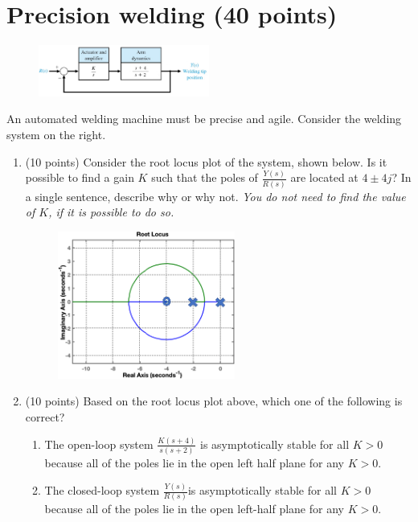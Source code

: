 \documentclass[11pt]{article}
\begin{document}
\section{Precision welding (40 points)}
\begin{figure}
    \centering
    \includegraphics[width=0.5\textwidth]{Acr12457187579904187728.png}
\end{figure}
An automated welding machine must be precise and agile. Consider the welding system on the right.\vspace{3em}
    \begin{enumerate}
        \item (10 points) Consider the root locus plot of the system, shown below. Is it possible to find a gain \(K\) such that the poles of \(\frac{Y(s)}{R(s)}\) are located at \(4\pm 4j\)? In a single sentence, describe why or why not. \textit{You do not need to find the value of \(K\), if it is possible to do so.}
        \begin{figure}[h!]
            \centering
            \includegraphics[width=0.55\textwidth]{Acr12457187579904-2994711.png}
        \end{figure}
        \item (10 points) Based on the root locus plot above, which one of the following is correct?
        \begin{enumerate}
            \item The open-loop system \(\frac{K(s+4)}{s(s+2)}\) is asymptotically stable for all \(K>0\) because all of the poles lie in the open left half plane for any \(K>0\).
            \item The closed-loop system \(\frac{Y(s)}{R(s)} \)is asymptotically stable for all \(K>0\) because all of the poles lie in the open left-half plane for any \(K>0\).

\end{enumerate}
\end{enumerate}
\end{document}

